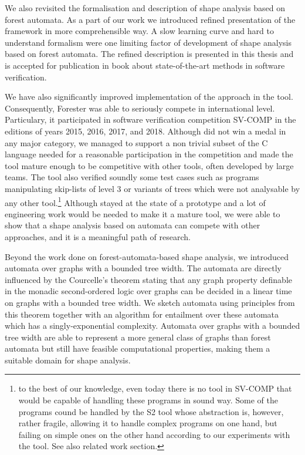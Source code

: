We also revisited the formalisation and description of shape analysis based on forest automata.
As a part of our work we introduced refined presentation of the framework in more comprehensible way.
A slow learning curve and hard to understand formalism were one limiting factor of development of shape analysis based on forest
automata.
The refined description is presented in this thesis and is accepted for publication in book
about state-of-the-art methods in software verification.

We have also significantly improved implementation of the approach in the \forester tool.
Consequently, Forester was able to seriously compete in international level.
Particulary, it participated in software verification competition SV-COMP \cite{svcompweb} in the editions of years 2015, 2016, 2017, and 2018.
Although \forester did not win a medal in any major category,
we managed to support a non trivial subset of the C language needed for a reasonable
participation in the competition and made the tool mature enough to be competitive with
other tools, often developed by large teams.
The tool also verified soundly some test cases such as programs manipulating skip-lists of level 3 or
variants of trees which were not analysable by any other tool.\footnote{to the best of our knowledge,
even today there is no tool in SV-COMP that would be capable of handling these programs in sound way.
Some of the programs cound be handled by the S2 tool\cite{locle:secondorder} whose abstraction is, however, rather fragile,
allowing it to handle complex programs on one hand, but failing on simple ones on the other hand according to our experiments with the tool. See also related work section.}
Although \forester stayed at the state of a prototype and a lot of engineering work would be needed to make
it a mature tool, we were able to show that a shape analysis based on automata
can compete with other approaches, and it is a meaningful path of research.

Beyond the work done on forest-automata-based shape analysis, we introduced automata over graphs
with a bounded tree width.
The automata are directly influenced by the Courcelle's theorem \cite{courcell_graph_2012}
stating that any graph property definable in the monadic second-ordered logic over graphs can be decided
in a linear time on graphs with a bounded tree width.
We sketch automata using principles from this theorem together with an algorithm for entailment
over these automata which has a singly-exponential complexity.
Automata over graphs with a bounded tree width are able to represent
a more general class of graphs than forest automata but still have feasible computational
properties, making them a suitable domain for shape analysis.

